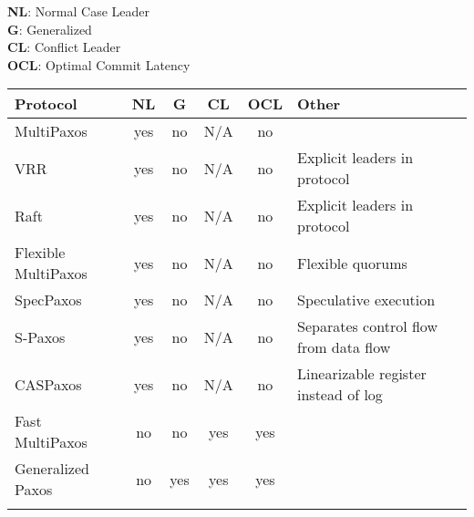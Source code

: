 \textbf{NL}: Normal Case Leader \\
\textbf{G}: Generalized \\
\textbf{CL}: Conflict Leader \\
\textbf{OCL}: Optimal Commit Latency

\newcommand{\yes}{yes}
\newcommand{\no}{no}
\newcommand{\na}{N/A}

\begin{center}
  \begin{tabular}{p{2.5in}ccccp{7.5in}}
    \toprule
    \textbf{Protocol}            & \textbf{NL} & \textbf{G} & \textbf{CL} & \textbf{OCL} & \textbf{Other}                                         \\ \midrule
    MultiPaxos                   & \yes        & \no        & \na         & \no          &                                                        \\ \rowcolor{flatgray!30}
    VRR                          & \yes        & \no        & \na         & \no          & Explicit leaders in protocol                           \\
    Raft                         & \yes        & \no        & \na         & \no          & Explicit leaders in protocol                           \\ \rowcolor{flatgray!30}
    Flexible \newline MultiPaxos & \yes        & \no        & \na         & \no          & Flexible quorums                                       \\
    SpecPaxos                    & \yes        & \no        & \na         & \no          & Speculative execution                                  \\ \rowcolor{flatgray!30}
    S-Paxos                      & \yes        & \no        & \na         & \no          & Separates control flow from data flow                  \\
    CASPaxos                     & \yes        & \no        & \na         & \no          & Linearizable register instead of log                   \\ \rowcolor{flatgray!30}
    Fast \newline MultiPaxos     & \no         & \no        & \yes        & \yes         &                                                        \\
    Generalized \newline Paxos   & \no         & \yes       & \yes        & \yes         &                                                        \\ \rowcolor{flatgray!30}

\end{tabular}
\end{center}
